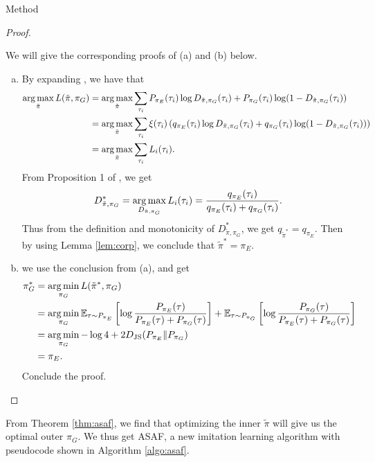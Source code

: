 \documentclass[10pt,aspectratio=169]{beamer}
\begin{document}
\begin{frame}{Method}
\begin{proof}
\begin{enumerate}[(a)]
		\end{enumerate}
		We will give the corresponding proofs of (a) and (b) below.
		\begin{enumerate}[(a)]
			\item By expanding , we have that
			      \[
				      \begin{aligned}
					      \operatorname*{arg\,max}_{\tilde{\pi}} L(\tilde{\pi}, \pi_G)
					       & = \operatorname*{arg\,max}_{\tilde{\pi}} \sum_{\tau_i} P_{\pi_E}(\tau_i)\log D_{\tilde{\pi}, \pi_G}(\tau_i) + P_{\pi_G}(\tau_i)\log(1-D_{\tilde{\pi}, \pi_G}(\tau_i))                         \\
					       & = \operatorname*{arg\,max}_{\tilde{\pi}} \sum_{\tau_i} \xi(\tau_i)\left(q_{\pi_E}(\tau_i)\log D_{\tilde{\pi}, \pi_G}(\tau_i) + q_{\pi_G}(\tau_i)\log(1-D_{\tilde{\pi}, \pi_G}(\tau_i))\right) \\
					       & = \operatorname*{arg\,max}_{\tilde{\pi}} \sum_{\tau_i} L_i(\tau_i).
				      \end{aligned}
			      \]
			      From Proposition 1 of \citep{gan}, we get
			      \[
				      D_{\tilde{\pi}, \pi_G}^* = \operatorname*{arg\,max}_{D_{\tilde{\pi}, \pi_G}}L_i(\tau_i) = \frac{q_{\pi_E}(\tau_i)}{q_{\pi_E}(\tau_i) + q_{\pi_G}(\tau_i)}.
			      \]
			      Thus from the definition and monotonicity of $D_{\tilde{\pi}, \pi_G}^*$, we get $q_{\tilde{\pi}^*} = q_{\pi_E}$. Then by using Lemma \ref{lem:corp}, we conclude that $\tilde{\pi}^* = \pi_E$.
			\item we use the conclusion from (a), and get
			      \[
				      \begin{aligned}
					      \pi_G^*
					       & = \operatorname*{arg\,min}_{\pi_G} L(\tilde{\pi}^*, \pi_G)                                                                                                                                                                                                 \\
					       & = \operatorname*{arg\,min}_{\pi_G} \mathbb{E}_{\tau\sim P_{\pi_E}}\left[\log \frac{P_{\pi_E}(\tau)}{P_{\pi_E}(\tau) + P_{\pi_G}(\tau)}\right] + \mathbb{E}_{\tau\sim P_{\pi_G}}\left[\log \frac{P_{\pi_G}(\tau)}{P_{\pi_E}(\tau) + P_{\pi_G}(\tau)}\right] \\
					       & = \operatorname*{arg\,min}_{\pi_G}-\log 4 + 2D_\text{JS}(P_{\pi_E}\|P_{\pi_G})                                                                                                                                                                             \\
					       & = \pi_E.
				      \end{aligned}
			      \]
			      Conclude the proof.
		\end{enumerate}
	\end{proof}
	From Theorem \ref{thm:asaf}, we find that optimizing the inner $\tilde{\pi}$ will give us the optimal outer $\pi_G$. We thus get ASAF, a new imitation learning algorithm with pseudocode shown in Algorithm \ref{algo:asaf}.


\end{frame}
\end{document}

